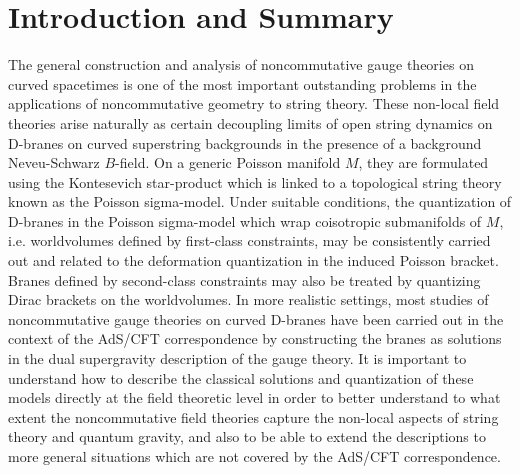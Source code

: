 \documentclass[11pt,a4paper]{article}
\newcommand{\1}{\mathbb{1}}
\renewcommand{\thefootnote}{\fnsymbol{footnote}}
\newcommand{\newsection}{\setcounter{equation}{0}\section}
\begin{document}
\newpage

\renewcommand{\thefootnote}{\arabic{footnote}} \setcounter{footnote}{0}

\newsection{Introduction and Summary\label{Intro}}

The general construction and analysis of noncommutative gauge theories
on curved spacetimes is one of the most important outstanding problems
in the applications of noncommutative geometry to string theory. These
non-local field theories arise naturally as certain decoupling limits
of open string dynamics on D-branes on curved superstring
backgrounds in the presence of a background Neveu-Schwarz
$B$-field. On a generic Poisson manifold $M$, they are formulated using
the Kontesevich star-product which is linked to a topological
string theory known as the Poisson sigma-model. Under suitable
conditions, the quantization of D-branes in the Poisson sigma-model
which wrap coisotropic submanifolds of $M$, i.e. worldvolumes defined
by first-class constraints, may be consistently carried out and
related to the deformation quantization in the induced Poisson
bracket. Branes defined by second-class constraints may also be
treated by quantizing Dirac brackets on the worldvolumes. In more
realistic settings, most studies of noncommutative gauge theories on
curved D-branes have been carried out in the context of the AdS/CFT
correspondence by constructing the branes as solutions in the dual
supergravity description of the gauge theory. It is important to
understand how to describe the classical solutions and quantization of
these models directly at the field theoretic level in order to better
understand to what extent the noncommutative field theories capture
the non-local aspects of string theory and quantum gravity, and also
to be able to extend the descriptions to more general situations which
are not covered by the AdS/CFT correspondence.
\end{document}

